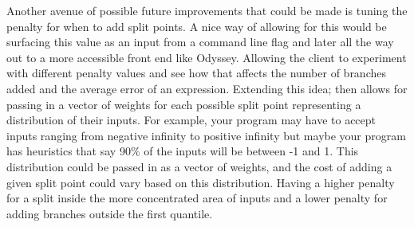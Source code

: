 \documentclass{article}
\begin{document}
Another avenue of possible future improvements that could be made is tuning the penalty for when to add split points. A nice way of allowing for this would be surfacing this value as an input from a command line flag and later all the way out to a more accessible front end like Odyssey. Allowing the client to experiment with different penalty values and see how that affects the number of branches added and the average error of an expression. Extending this idea; then allows for passing in a vector of weights for each possible split point representing a distribution of their inputs. For example, your program may have to accept inputs ranging from negative infinity to positive infinity but maybe your program has heuristics that say 90\% of the inputs will be between -1 and 1.  This distribution could be passed in as a vector of weights, and the cost of adding a given split point could vary based on this distribution. Having a higher penalty for a split inside the more concentrated area of inputs and a lower penalty for adding branches outside the first quantile.



\newpage
\appendix
\lstset{style=racket-source-code}
\end{document}
